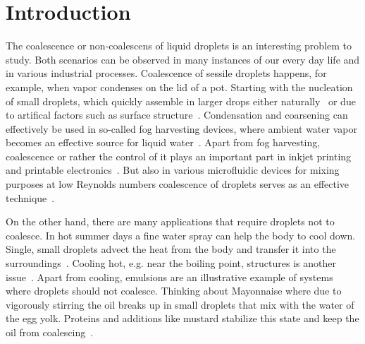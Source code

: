 \documentclass[twocolumn,amsmath,amssymb,showpacs,pre,nofootinbib,superscriptaddress]{revtex4-1} %
\begin{document}
\maketitle

\newcommand{\ts}{\textsuperscript}

\section{Introduction}\label{sec:intro}
The coalescence or non-coalescens of liquid droplets is an interesting problem to study. 
Both scenarios can be observed in many instances of our every day life and in various industrial processes.
Coalescence of sessile droplets happens, for example, when vapor condenses on the lid of a pot.
Starting with the nucleation of small droplets, which quickly assemble in larger drops either naturally~\cite{PhysRevA.43.1906} or due to artifical factors such as surface structure~\cite{C1SM06219K}. 
Condensation and coarsening can effectively be used in so-called fog harvesting devices, where ambient water vapor becomes an effective source for liquid water~\cite{zhang2015inkjet, shi2018fog}.
Apart from fog harvesting, coalescence or rather the control of it plays an important part in inkjet printing and printable electronics~\cite{jo2009evaluation, singh2010inkjet, Kim_2005, Luechinger_2008}.
But also in various microfluidic devices for mixing purposes at low Reynolds numbers coalescence of droplets serves as an effective technique~\cite{https://doi.org/10.1002/pen.760352206, doi:10.1063/1.858199}. 

On the other hand, there are many applications that require droplets not to coalesce.
In hot summer days a fine water spray can help the body to cool down.
Single, small droplets advect the heat from the body and transfer it into the surroundings~\cite{kim2007spray}.
Cooling hot, e.g. near the boiling point, structures is another issue~\cite{JIA2003829}.
Apart from cooling, emulsions are an illustrative example of systems where droplets should not coalesce.
Thinking about Mayonnaise where due to vigorously stirring the oil breaks up in small droplets that mix with the water of the egg yolk.
Proteins and additions like mustard stabilize this state and keep the oil from coalescing~\cite{harrison1985factors, DEPREE2001157}.
\end{document}
